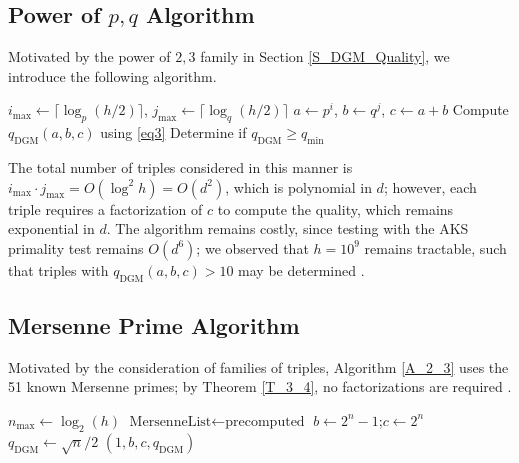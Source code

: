 \documentclass[11pt,letterpaper]{amsart}
\begin{document}
\subsection{Power of $p,q$ Algorithm}
Motivated by the power of $2, 3$ family in Section \ref{S_DGM_Quality}, we introduce the following algorithm.

\begin{algorithm}[!t]
\caption{Power of $p,q$ Method}\label{A_p_q}
\begin{algorithmic}[1]
\State $i_{\max} \gets \lceil\log_p(h/2)\rceil$, $j_{\max} \gets \lceil\log_q(h/2)\rceil$
    \State $a \gets p^i$, $b \gets q^j$, $c \gets a+b$
        \State Compute $q_{\mathrm{DGM}}(a,b,c)$ using \eqref{eq3}
        \State Determine if $q_{\mathrm{DGM}} \ge q_{\min}$
    \EndIf
\EndFor
\end{algorithmic}
\end{algorithm}
The total number of triples considered in this manner is $i_{\max}\cdot j_{\max}=O(\log^2 h)=O(d^2)$, which is polynomial in $d$; however, each triple requires a factorization of $c$ to compute the quality, which remains exponential in $d$. The algorithm remains costly, since testing with the AKS primality test remains $O(d^6)$; we observed that $h=10^9$ remains tractable, such that triples with $q_{\mathrm{DGM}}(a, b, c)>10$ may be determined \cite{agrawal2004primes}.

\subsection{Mersenne Prime Algorithm}

Motivated by the consideration of families of triples, Algorithm \ref{A_2_3} uses the 51 known Mersenne primes; by Theorem \ref{T_3_4}, no factorizations are required \cite{mersennelist}.

\begin{algorithm}[!t]
\caption{Mersenne Prime Algorithm}\label{A_2_3}
\begin{algorithmic}[1]
\State $n_{\max}\gets\log_2(h)$
\State $\text{MersenneList}\gets\text{precomputed}$
  \State $b\gets 2^n-1$;\quad $c\gets 2^n$
  \State $q_{\mathrm{DGM}}\gets \sqrt{n}/2$ 
    \Return $(1,b,c,q_{\mathrm{DGM}})$
  \EndIf
\EndFor
\end{algorithmic}
\end{algorithm}
\end{document}
